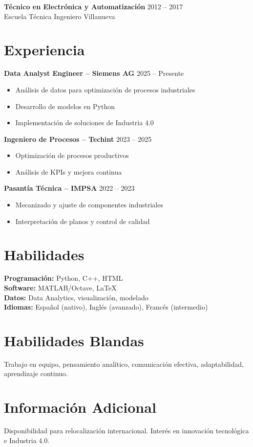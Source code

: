 \documentclass[a4paper,11pt]{article}
\begin{document}
\vspace{0.2cm}

\textbf{Técnico en Electrónica y Automatización} \hfill {\color{accent}2012 -- 2017} \\
Escuela Técnica Ingeniero Villanueva

\section*{Experiencia}

\textbf{Data Analyst Engineer – Siemens AG} \hfill {\color{accent}2025 -- Presente}
\begin{itemize}
    \item Análisis de datos para optimización de procesos industriales
    \item Desarrollo de modelos en Python
    \item Implementación de soluciones de Industria 4.0
\end{itemize}

\textbf{Ingeniero de Procesos – Techint} \hfill {\color{accent}2023 -- 2025}
\begin{itemize}
    \item Optimización de procesos productivos
    \item Análisis de KPIs y mejora continua
\end{itemize}

\textbf{Pasantía Técnica – IMPSA} \hfill {\color{accent}2022 -- 2023}
\begin{itemize}
    \item Mecanizado y ajuste de componentes industriales
    \item Interpretación de planos y control de calidad
\end{itemize}

\section*{Habilidades}

\textbf{Programación:} Python, C++, HTML \\
\textbf{Software:} MATLAB/Octave, LaTeX \\
\textbf{Datos:} Data Analytics, visualización, modelado \\
\textbf{Idiomas:} Español (nativo), Inglés (avanzado), Francés (intermedio)

\section*{Habilidades Blandas}

Trabajo en equipo, pensamiento analítico, comunicación efectiva, adaptabilidad, aprendizaje continuo.

\section*{Información Adicional}

Disponibilidad para relocalización internacional. Interés en innovación tecnológica e Industria 4.0.
\end{document}
